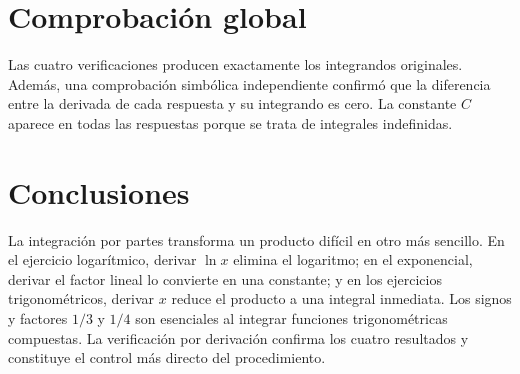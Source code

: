 \section{Comprobación global}
Las cuatro verificaciones producen exactamente los integrandos originales. Además, una comprobación simbólica independiente confirmó que la diferencia entre la derivada de cada respuesta y su integrando es cero. La constante $C$ aparece en todas las respuestas porque se trata de integrales indefinidas.

\section{Conclusiones}
La integración por partes transforma un producto difícil en otro más sencillo. En el ejercicio logarítmico, derivar $\ln x$ elimina el logaritmo; en el exponencial, derivar el factor lineal lo convierte en una constante; y en los ejercicios trigonométricos, derivar $x$ reduce el producto a una integral inmediata. Los signos y factores $1/3$ y $1/4$ son esenciales al integrar funciones trigonométricas compuestas. La verificación por derivación confirma los cuatro resultados y constituye el control más directo del procedimiento.

\nocite{thomas2018calculus,openstax2016calculus1}

